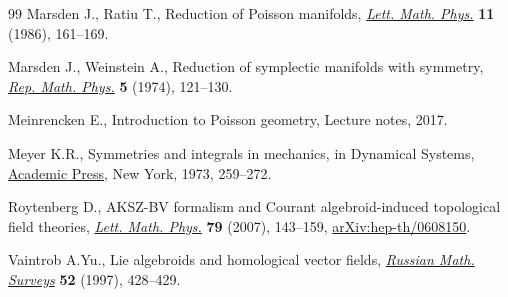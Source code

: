 \begin{thebibliography}{99}
Marsden J., Ratiu T., Reduction of {P}oisson manifolds, \href{https://doi.org/10.1007/BF00398428}{\textit{Lett. Math.
 Phys.}} \textbf{11} (1986), 161--169.

Marsden J., Weinstein A., Reduction of symplectic manifolds with symmetry,
 \href{https://doi.org/10.1016/0034-4877(74)90021-4}{\textit{Rep. Math. Phys.}} \textbf{5} (1974), 121--130.

Meinrencken E., Introduction to {P}oisson geometry, {L}ecture notes, 2017.

Meyer K.R., Symmetries and integrals in mechanics, in Dynamical {S}ystems,
 \href{https://doi.org/10.1016/B978-0-12-550350-1.50025-4}{Academic Press}, New York, 1973, 259--272.

Roytenberg D., A{KSZ}-{BV} formalism and {C}ourant algebroid-induced
 topological field theories, \href{https://doi.org/10.1007/s11005-006-0134-y}{\textit{Lett. Math. Phys.}} \textbf{79} (2007),
 143--159, \href{https://arxiv.org/abs/hep-th/0608150}{arXiv:hep-th/0608150}.

Vaintrob A.Yu., Lie algebroids and homological vector fields, \href{https://doi.org/10.1070/RM1997v052n02ABEH001802}{\textit{Russian
 Math. Surveys}} \textbf{52} (1997), 428--429.

\end{thebibliography}
